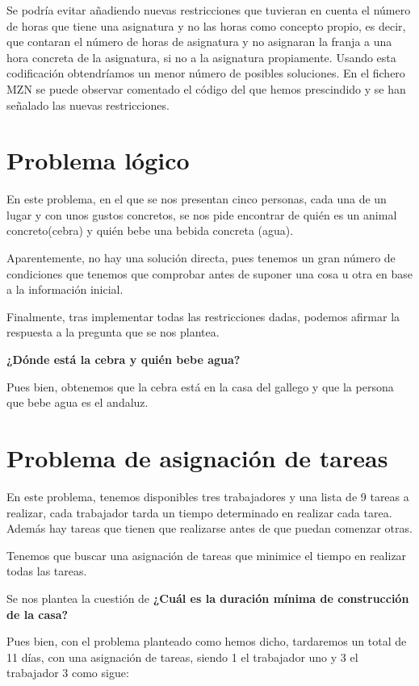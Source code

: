 Se podría evitar añadiendo nuevas restricciones que tuvieran en cuenta el número de horas que tiene una asignatura y no las horas como concepto propio, es decir, que contaran el número de horas de asignatura y no asignaran la franja a una hora concreta de la asignatura, si no a la asignatura propiamente. Usando esta codificación obtendríamos un menor número de posibles soluciones.
En el fichero MZN se puede observar comentado el código del que hemos prescindido y se han señalado las nuevas restricciones.

\newpage

\section{Problema lógico}

En este problema, en el que se nos presentan cinco personas, cada una de un lugar y con unos gustos concretos, se nos pide encontrar de quién es un animal concreto(cebra) y quién bebe una bebida concreta (agua).

Aparentemente, no hay una solución directa, pues tenemos un gran número de condiciones que tenemos que comprobar antes de suponer una cosa u otra en base a la información inicial.

Finalmente, tras implementar todas las restricciones dadas, podemos afirmar la respuesta a la pregunta que se nos plantea.

\textbf{¿Dónde está la cebra y quién bebe agua?}

Pues bien, obtenemos que la cebra está en la casa del gallego y que la persona que bebe agua es el andaluz.

\newpage

\section{Problema de asignación de tareas}

En este problema, tenemos disponibles tres trabajadores y una lista de 9 tareas a realizar, cada trabajador tarda un tiempo determinado en realizar cada tarea. Además hay tareas que tienen que realizarse antes de que puedan comenzar otras.

Tenemos que buscar una asignación de tareas que minimice el tiempo en realizar todas las tareas.

Se nos plantea la cuestión de \textbf{¿Cuál es la duración mínima de construcción de la casa?}

Pues bien, con el problema planteado como hemos dicho, tardaremos un total de 11 días, con una asignación de tareas, siendo 1 el trabajador uno y 3 el trabajador 3 como sigue:

